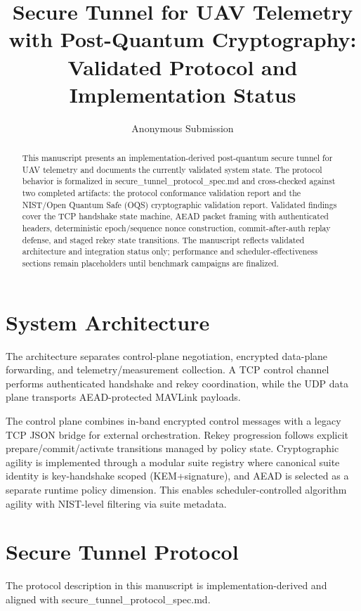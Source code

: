 \documentclass[conference]{IEEEtran}
\title{Secure Tunnel for UAV Telemetry with Post-Quantum Cryptography: Validated Protocol and Implementation Status}
\author{Anonymous Submission}
\begin{document}
\maketitle

\begin{abstract}
This manuscript presents an implementation-derived post-quantum secure tunnel for UAV telemetry and documents the currently validated system state. The protocol behavior is formalized in secure\_tunnel\_protocol\_spec.md and cross-checked against two completed artifacts: the protocol conformance validation report and the NIST/Open Quantum Safe (OQS) cryptographic validation report. Validated findings cover the TCP handshake state machine, AEAD packet framing with authenticated headers, deterministic epoch/sequence nonce construction, commit-after-auth replay defense, and staged rekey state transitions. The manuscript reflects validated architecture and integration status only; performance and scheduler-effectiveness sections remain placeholders until benchmark campaigns are finalized.
\end{abstract}

\section{System Architecture}
The architecture separates control-plane negotiation, encrypted data-plane forwarding, and telemetry/measurement collection. A TCP control channel performs authenticated handshake and rekey coordination, while the UDP data plane transports AEAD-protected MAVLink payloads.

The control plane combines in-band encrypted control messages with a legacy TCP JSON bridge for external orchestration. Rekey progression follows explicit prepare/commit/activate transitions managed by policy state. Cryptographic agility is implemented through a modular suite registry where canonical suite identity is key-handshake scoped (KEM+signature), and AEAD is selected as a separate runtime policy dimension. This enables scheduler-controlled algorithm agility with NIST-level filtering via suite metadata.

\section{Secure Tunnel Protocol}
The protocol description in this manuscript is implementation-derived and aligned with secure\_tunnel\_protocol\_spec.md.
\end{document}
